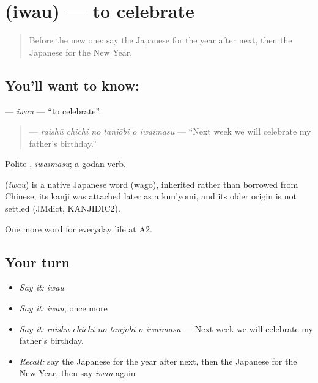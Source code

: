 \section[\texorpdfstring{\ja{いわう} (iwau)}{いわう (iwau)}]{ (iwau) — to celebrate}

\label{lesson:JA-C170-iwau}



\begin{quote}
Before the new one: say the Japanese for the year after next, then the Japanese for the New Year.
\end{quote}

\subsection*{You'll want to know: }
\textbf{} — \emph{iwau} — \textquotedblleft{}to celebrate\textquotedblright{}.

\begin{quote}
\textbf{   } — \emph{raishū chichi no tanjōbi o iwaimasu} — \textquotedblleft{}Next week we will celebrate my father's birthday.\textquotedblright{}
\end{quote}

Polite \textbf{}, \emph{iwaimasu}; a godan verb.

\begin{cousinweb}
\textbf{} (\emph{iwau}) is a native Japanese word (wago), inherited rather than borrowed from Chinese; its kanji was attached later as a kun'yomi, and its older origin is not settled (JMdict, KANJIDIC2).
\end{cousinweb}

\begin{grammarlens}[title={What you've built}]
One more word for everyday life at A2.
\end{grammarlens}

\subsection*{Your turn}
\begin{itemize}
\raggedright
  \item \emph{Say it:} \emph{iwau}
  \item \emph{Say it:} \emph{iwau}, once more
  \item \emph{Say it:} \emph{raishū chichi no tanjōbi o iwaimasu} — Next week we will celebrate my father's birthday.
  \item \emph{Recall:} say the Japanese for the year after next, then the Japanese for the New Year, then say \emph{iwau} again
\end{itemize}

